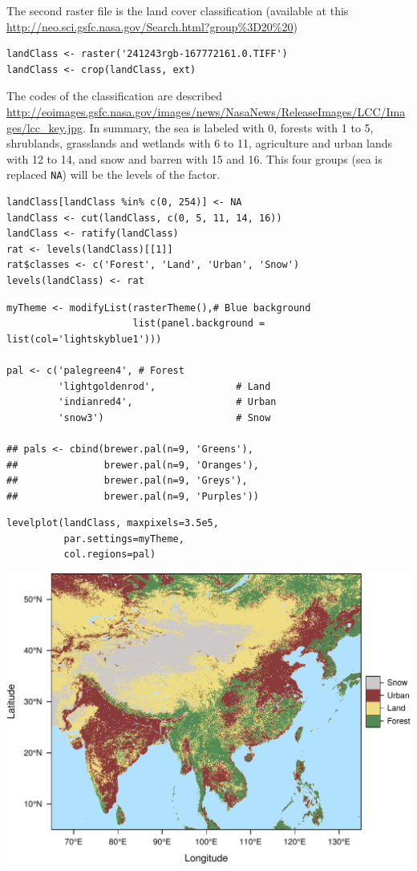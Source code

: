 The second raster file is the land cover classification (available at this \url{http://neo.sci.gsfc.nasa.gov/Search.html?group%3D20%20})




\lstset{language=R}
\begin{lstlisting}
landClass <- raster('241243rgb-167772161.0.TIFF')
landClass <- crop(landClass, ext)
\end{lstlisting}

The codes of the classification are described \url{http://eoimages.gsfc.nasa.gov/images/news/NasaNews/ReleaseImages/LCC/Images/lcc_key.jpg}. In summary, the
sea is labeled with 0, forests with 1 to 5, shrublands, grasslands and
wetlands with 6 to 11, agriculture and urban lands with 12 to 14, and
snow and barren with 15 and 16.  This four groups (sea is replaced
\texttt{NA}) will be the levels of the factor.


\lstset{language=R}
\begin{lstlisting}
landClass[landClass %in% c(0, 254)] <- NA
landClass <- cut(landClass, c(0, 5, 11, 14, 16))
landClass <- ratify(landClass)
rat <- levels(landClass)[[1]]
rat$classes <- c('Forest', 'Land', 'Urban', 'Snow')
levels(landClass) <- rat
\end{lstlisting}


\lstset{language=R}
\begin{lstlisting}
myTheme <- modifyList(rasterTheme(),# Blue background
                      list(panel.background = list(col='lightskyblue1')))

pal <- c('palegreen4', # Forest
         'lightgoldenrod',              # Land
         'indianred4',                  # Urban
         'snow3')                       # Snow

## pals <- cbind(brewer.pal(n=9, 'Greens'),
##               brewer.pal(n=9, 'Oranges'),
##               brewer.pal(n=9, 'Greys'),
##               brewer.pal(n=9, 'Purples'))
\end{lstlisting}


\lstset{language=R}
\begin{lstlisting}
levelplot(landClass, maxpixels=3.5e5,
          par.settings=myTheme,
          col.regions=pal)
\end{lstlisting}

\includegraphics[width=.9\linewidth]{figs/landClass.pdf}

